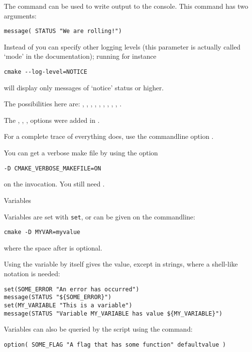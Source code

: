 The  command can be used to write output
to the console. This command has two arguments:
\begin{lstlisting}
message( STATUS "We are rolling!")
\end{lstlisting}
Instead of  you can specify other logging levels
(this parameter is actually called `mode' in the documentation);
running for instance
\begin{verbatim}
cmake --log-level=NOTICE
\end{verbatim}
will display only messages of `notice' status or higher.

The possibilities here are: , ,
, , , ,
, , , .

The , , ,  options
were added in .

For a complete trace of everything  does, use
the commandline option .

You can get a verbose make file by using the option
\begin{verbatim}
-D CMAKE_VERBOSE_MAKEFILE=ON
\end{verbatim}
on the  invocation. You still need .

 {Variables}

Variables are set with \texttt{set},
or can be given on the commandline:
\begin{lstlisting}
cmake -D MYVAR=myvalue
\end{lstlisting}
where the space after  is optional.

Using the variable by itself gives the value,
except in strings, where a shell-like notation is needed:
\begin{lstlisting}
set(SOME_ERROR "An error has occurred")
message(STATUS "${SOME_ERROR}")
set(MY_VARIABLE "This is a variable")
message(STATUS "Variable MY_VARIABLE has value ${MY_VARIABLE}")
\end{lstlisting}

Variables can also be queried by the  script using the  command:
\begin{lstlisting}
option( SOME_FLAG "A flag that has some function" defaultvalue )
\end{lstlisting}

